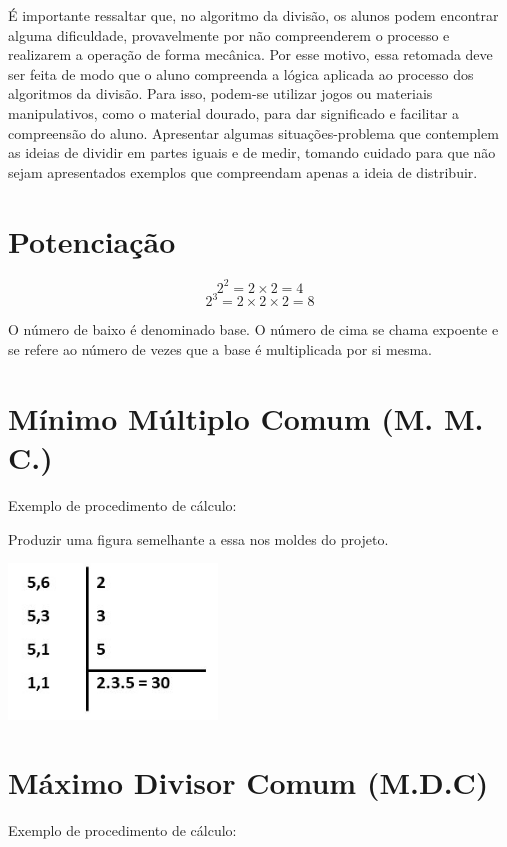 É importante ressaltar que, no algoritmo da divisão, os alunos podem
encontrar alguma dificuldade, provavelmente por não compreenderem o
processo e realizarem a operação de forma mecânica. Por esse motivo,
essa retomada deve ser feita de modo que o aluno compreenda a lógica
aplicada ao processo dos algoritmos da divisão. Para isso, podem-se
utilizar jogos ou materiais manipulativos, como o material dourado, para
dar significado e facilitar a compreensão do aluno. Apresentar algumas
situações-problema que contemplem as ideias de dividir em partes iguais
e de medir, tomando cuidado para que não sejam apresentados exemplos que
compreendam apenas a ideia de distribuir.

\section*{Potenciação}

$$2^2 = 2\times 2 = 4$$ 
$$2^3 = 2\times 2\times 2 = 8$$

O número de baixo é denominado base. O número de cima se chama expoente
e se refere ao número de vezes que a base é multiplicada por si mesma.

\section{Mínimo Múltiplo Comum (M. M. C.)}

Exemplo de procedimento de cálculo:

Produzir uma figura semelhante a essa nos moldes do projeto.


\includegraphics[width=2.18605in,height=1.62945in]{./imgSAEB_6_MAT/media/image21.jpeg}

\section{Máximo Divisor Comum (M.D.C)}

Exemplo de procedimento de cálculo:

